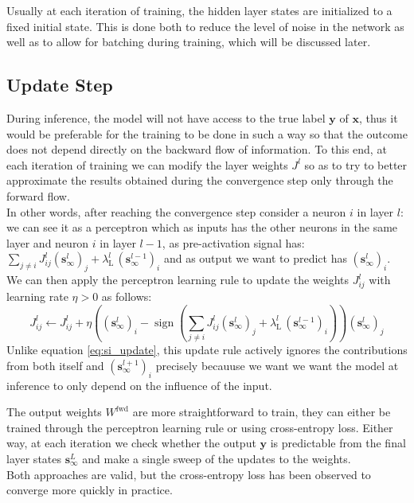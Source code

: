 \documentclass[a4paper,12pt]{report}
\begin{document}
Usually at each iteration of training, the hidden layer states are initialized to a 
fixed initial state. This is done both to reduce the level of noise in the network as
well as to allow for batching during training, which will be discussed later.

\subsection{Update Step}
During inference, the model will not have access to the true label $\mathbf{y}$ of 
$\mathbf{x}$, thus it would be preferable for the training to be done in such a way
so that the outcome does not depend directly on the backward flow of information.
To this end, at each iteration of training we can modify the layer weights $J^l$ 
so as to try to better approximate the results obtained during the convergence step
only through the forward flow. \\
In other words, after reaching the convergence step consider a neuron $i$ in layer 
$l$: we can see it as a perceptron which as inputs has the other neurons in the same 
layer and neuron $i$ in layer $l-1$, as pre-activation signal has: $\sum_{j \neq i} 
J_{ij}^l \left(\mathbf{s}^{l}_{\infty}\right)_j + \lambda_{\mathrm{L}}^l\, 
\left(\mathbf{s}^{l-1}_{\infty}\right)_i$ and as output we want to predict has 
$\left(\mathbf{s}^{l}_{\infty}\right)_i$. We can then apply the perceptron learning
rule to update the weights $J_{ij}^l$ with learning rate $\eta > 0$ as follows:
\begin{equation}
    J_{ij}^l \leftarrow J_{ij}^l + \eta \left(\left(\mathbf{s}^{l}_{\infty}\right)_i -
    \operatorname{sign}\left(\sum_{j \neq i} J_{ij}^l
    \left(\mathbf{s}^{l}_{\infty}\right)_j + \lambda_{\mathrm{L}}^l\,
    \left(\mathbf{s}^{l-1}_{\infty}\right)_i\right)\right)
    \left(\mathbf{s}^{l}_{\infty}\right)_j
\end{equation}
Unlike equation \ref{eq:si_update}, this update rule actively ignores the contributions
from both itself and $\left(\mathbf{s}^{l+1}_{\infty}\right)_i$ precisely becauuse we 
want we want the model at inference to only depend on the influence of the input. 
\vspace{0.5em}

The output weights $W^{\mathrm{fwd}}$ are more straightforward to train, they can 
either be trained through the perceptron learning rule or using cross-entropy loss. 
Either way, at each iteration we check whether the output $\mathbf{y}$ is predictable 
from the final layer states $\mathbf{s}^{L}_{\infty}$ and make a single sweep of the 
updates to the weights. \\
Both approaches are valid, but the cross-entropy loss has been observed to converge 
more quickly in practice.
\end{document}
